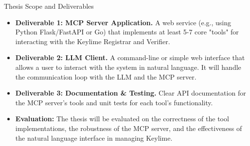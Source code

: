 \documentclass{beamer}
\begin{document}
\begin{frame}{Thesis Scope and Deliverables}
    \begin{itemize}
        \item \textbf{Deliverable 1: MCP Server Application.} A web service (e.g., using Python Flask/FastAPI or Go) that implements at least 5-7 core "tools" for interacting with the Keylime Registrar and Verifier.
        \vspace{1em}
        \item \textbf{Deliverable 2: LLM Client.} A command-line or simple web interface that allows a user to interact with the system in natural language. It will handle the communication loop with the LLM and the MCP server.
        \vspace{1em}
        \item \textbf{Deliverable 3: Documentation \& Testing.} Clear API documentation for the MCP server's tools and unit tests for each tool's functionality.
        \vspace{1em}
        \item \textbf{Evaluation:} The thesis will be evaluated on the correctness of the tool implementations, the robustness of the MCP server, and the effectiveness of the natural language interface in managing Keylime.
    \end{itemize}
\end{frame}
\end{document}
